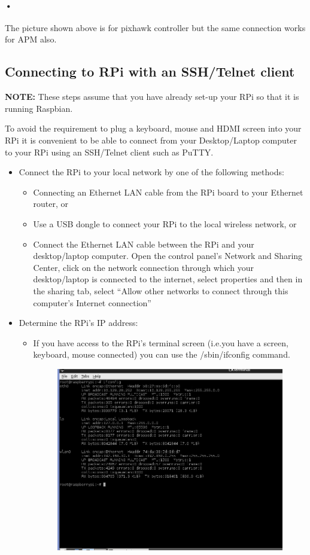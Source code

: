 \documentclass[11pt,a4paper]{article}
\begin{document}
	\paragraph{•} The picture shown above is for pixhawk controller but the same connection works for APM also.
	 \subsection{Connecting to RPi with an SSH/Telnet client}
	 \textbf{NOTE:} These steps assume that you have already set-up your RPi so that it is running Raspbian.

To avoid the requirement to plug a keyboard, mouse and HDMI screen into your RPi it is convenient to be able to connect from your Desktop/Laptop computer to your RPi using an SSH/Telnet client such as PuTTY.
	 \begin{itemize}
	 	\item Connect the RPi to your local network by one of the following methods:
			\begin{itemize}
				\item Connecting an Ethernet LAN cable from the RPi board to your Ethernet router, or
				\item Use a USB dongle to connect your RPi to the local wireless network, or
				\item Connect the Ethernet LAN cable between the RPi and your desktop/laptop computer. Open the control panel’s Network and Sharing Center, click on the network connection through which your desktop/laptop is connected to the internet, select properties and then in the sharing tab, select “Allow other networks to connect through this computer’s Internet connection”
\end{itemize}
	\item Determine the RPi’s IP address:
	\begin{itemize}
		\item If you have access to the RPi’s terminal screen (i.e.you have a screen, keyboard, mouse connected) you can use the /sbin/ifconfig command.
			\begin{figure}[H]
				\centering
				\includegraphics[scale=0.37]{ip}

\end{figure}
\end{itemize}
\end{itemize}
\end{document}
